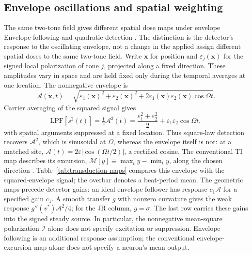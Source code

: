 \documentclass[11pt,a4paper]{article}
\newcommand{\Sig}{\sigma}
\providecommand{\DIFaddtex}[1]{{\protect\color{blue} \sf #1}} %
\providecommand{\DIFdeltex}[1]{{\protect\color{red} \scriptsize #1}} %
\providecommand{\DIFaddbegin}{} %
\providecommand{\DIFaddend}{} %
\providecommand{\DIFdelbegin}{} %
\providecommand{\DIFdelend}{} %
\providecommand{\DIFadd}[1]{\texorpdfstring{\DIFaddtex{#1}}{#1}} %
\providecommand{\DIFdel}[1]{\texorpdfstring{\DIFdeltex{#1}}{}} %
\begin{document}
\subsection{Envelope oscillations and spatial weighting}\label{sec:envelope}
\DIFdelbegin \DIFdel{The same two-tone field gives different spatial dose maps under envelope }\DIFdelend \DIFaddbegin \DIFadd{Envelope }\DIFaddend following and quadratic detection \DIFdelbegin \DIFdel{. The distinction is the detector's response to the oscillating envelope, not a change in the applied }\DIFdelend \DIFaddbegin \DIFadd{assign different spatial doses
to the same two-tone }\DIFaddend field.
Write $\mathbf x$ for position and $\varepsilon_j(\mathbf x)$ for the signed local
polarization of tone $j$, projected along a fixed direction. These amplitudes vary
in space and are held fixed only during the temporal averages at one location.
The nonnegative envelope is
\[
\mathcal A(\mathbf x,t)=\sqrt{\varepsilon_1(\mathbf x)^2+\varepsilon_2(\mathbf x)^2
+2\varepsilon_1(\mathbf x)\varepsilon_2(\mathbf x)\cos\Omega t}.
\]
Carrier averaging of the squared signal gives
\begin{equation}
\mathrm{LPF}[s^2(t)]=\tfrac12\mathcal A^2(t)
=\frac{\varepsilon_1^2+\varepsilon_2^2}{2}+\varepsilon_1\varepsilon_2\cos\Omega t,
\label{eq:sqenv}
\end{equation}
with spatial arguments suppressed at a fixed location. Thus square-law detection recovers $\mathcal A^2$,
which is sinusoidal at $\Omega$, whereas the envelope itself is not: at a matched
site, $\mathcal A(t)=2\varepsilon|\cos(\Omega t/2)|$, a rectified cosine.
The conventional TI map describes its excursion,
$\mathcal{M}[y]\equiv\max_t y-\min_t y$, along the chosen direction \cite{grossman2017}.
Table~\ref{tab:transduction-maps} compares this envelope with the squared-envelope
signal; the overbar denotes a beat-period mean. The geometric maps precede detector gains: an ideal envelope follower has
response $c_1\mathcal A$ for a specified gain $c_1$. A smooth transfer $g$
with nonzero curvature gives the weak response $g''(v^*)\mathcal A^2/4$;
for the JR column, $g=\Sig$.
The last row carries these gains into the signed steady source. In particular,
the nonnegative mean-square polarization $\mathcal I$ alone does not specify
excitation or suppression.
Envelope following is an additional response assumption; the conventional
envelope-excursion map alone does not specify a neuron's mean output.
\end{document}
